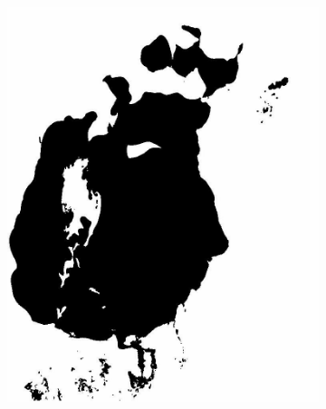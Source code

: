 \documentclass[12pt,a4paper]{article}
\begin{document}
\begin{figure}
\begin{subfigure}[b]{0.19\textwidth}
        \includegraphics[width=\textwidth]{../img/1987w.jpg}
    \end{subfigure}
    \begin{subfigure}[b]{0.19\textwidth}
        \centering

\end{subfigure}
\end{figure}
\end{document}
